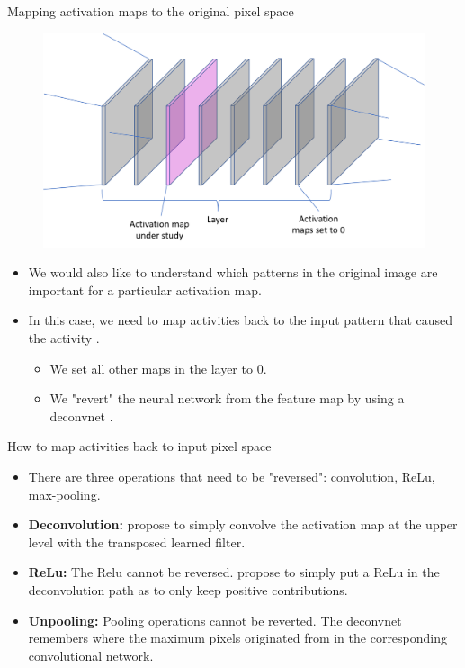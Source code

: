 \documentclass[xcolor=pdftex,dvipsnames,table]{beamer}
\begin{document}
\begin{frame}{Mapping activation maps to the original pixel space}
\begin{figure}[htb]
  \centering
  \includegraphics[width=.7\textwidth]{../graphics/Vis_activationmaps_zero.png}
\end{figure}
\begin{itemize}
	\item We would also like to understand which patterns in the original image are important for a particular activation map.
	\item In this case, we need to map activities back to the input pattern that caused the activity \cite{Zeiler:2013}. 
	\begin{itemize}
		\item We set all other maps in the layer to 0. 
		\item We "revert" the neural network from the feature map by using a deconvnet \cite{Zeiler:2011}.
	\end{itemize}
\end{itemize}
\end{frame}

\begin{frame}{How to map activities back to input pixel space}
\begin{itemize}
	\item There are three operations that need to be "reversed": convolution, ReLu, max-pooling. 
	\item {\bf Deconvolution:} \cite{Zeiler:2013} propose to simply convolve the activation map at the upper level with the transposed learned filter. 
	\item {\bf ReLu:} The Relu cannot be reversed. \cite{Zeiler:2013}  propose to simply put a ReLu in the deconvolution path as to only keep positive contributions. 
	\item {\bf Unpooling:} Pooling operations cannot be reverted. The deconvnet remembers where the maximum pixels originated from in the corresponding convolutional network. 
\end{itemize}
\end{frame}
\end{document}
